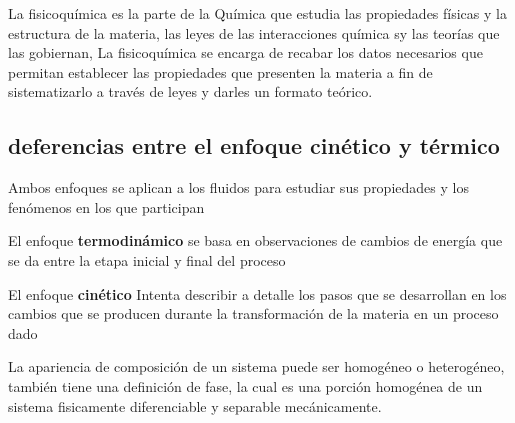 \documentclass[11pt]{report}
\theoremstyle{plain}
\theoremstyle{definition}
\begin{document}
\tableofcontents




La fisicoquímica es la parte de la Química que estudia las propiedades físicas y la estructura de la materia, las leyes de las interacciones química sy las teorías que las gobiernan, La fisicoquímica se encarga de recabar los datos necesarios que permitan establecer las propiedades que presenten la materia a fin de sistematizarlo a través de leyes y darles un formato teórico.

\subsection{deferencias entre el enfoque cinético y térmico}
Ambos enfoques se aplican a los fluidos para estudiar sus propiedades y los fenómenos en los que participan

El enfoque \textbf{termodinámico} se basa en observaciones de cambios de energía que se da entre la etapa inicial y final del proceso

El enfoque \textbf{cinético} Intenta describir a detalle los pasos que se desarrollan en los cambios que se producen durante la transformación de la materia en un proceso dado


La apariencia de composición de un sistema puede ser homogéneo o heterogéneo, también tiene una definición de fase, la cual es una porción homogénea de un sistema fisicamente diferenciable y separable mecánicamente.












\end{document}
